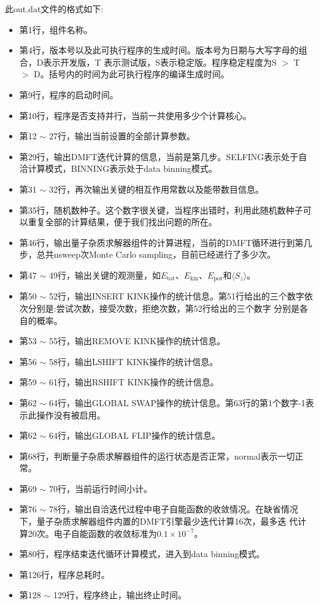 此out.dat文件的格式如下:
\begin{itemize}
\item 第1行，组件名称{\azalea}。
\item 第4行，版本号以及此可执行程序的生成时间。版本号为日期与大写字母的组合，D表示开发版，T
表示测试版，S表示稳定版。程序稳定程度为S $>$ T $>$ D。括号内的时间为此可执行程序的编译生成时间。
\item 第9行，程序的启动时间。 
\item 第10行，程序是否支持并行，当前一共使用多少个计算核心。
\item 第12 $\sim$ 27行，输出当前设置的全部计算参数。
\item 第29行，输出DMFT迭代计算的信息，当前是第几步。SELFING表示处于自洽计算模式，BINNING表示处于data binning模式。
\item 第31 $\sim$ 32行，再次输出关键的相互作用常数以及能带数目信息。
\item 第35行，随机数种子。这个数字很关键，当程序出错时，利用此随机数种子可以重复全部的计算结果，便于我们找出问题的所在。
\item 第46行，输出量子杂质求解器组件的计算进程，当前的DMFT循环进行到第几步，总共nsweep次Monte Carlo sampling，目前已经进行了多少次。
\item 第47 $\sim$ 49行，输出关键的观测量，如$E_{\text{tot}}$、$E_{\text{kin}}$、$E_{\text{pot}}$和$\langle S_{z}\rangle$。
\item 第50 $\sim$ 52行，输出INSERT KINK操作的统计信息。第51行给出的三个数字依次分别是:尝试次数，接受次数，拒绝次数，第52行给出的三个数字
分别是各自的概率。
\item 第53 $\sim$ 55行，输出REMOVE KINK操作的统计信息。
\item 第56 $\sim$ 58行，输出LSHIFT KINK操作的统计信息。
\item 第59 $\sim$ 61行，输出RSHIFT KINK操作的统计信息。
\item 第62 $\sim$ 64行，输出GLOBAL SWAP操作的统计信息。第63行的第1个数字-1表示此操作没有被启用。
\item 第62 $\sim$ 64行，输出GLOBAL FLIP操作的统计信息。
\item 第68行，判断量子杂质求解器组件的运行状态是否正常，normal表示一切正常。
\item 第69 $\sim$ 70行，当前运行时间小计。
\item 第76 $\sim$ 78行，输出自洽迭代过程中电子自能函数的收敛情况。在缺省情况下，量子杂质求解器组件内置的DMFT引擎最少迭代计算16次，最多迭
代计算20次。电子自能函数的收敛标准为$0.1 \times 10^{-7}$。
\item 第80行，程序结束迭代循环计算模式，进入到data binning模式。
\item 第126行，程序总耗时。
\item 第128 $\sim$ 129行，程序终止，输出终止时间。
\end{itemize}

